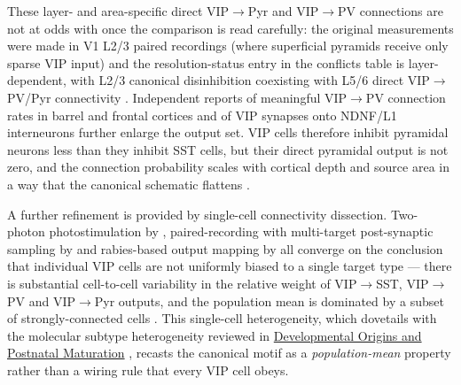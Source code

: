 \documentclass[11pt]{article}
\let\origrightarrow\rightarrow
\def\rightarrow{\ensuremath{\origrightarrow}}
\begin{document}
These layer- and area-specific direct VIP\rightarrow Pyr and VIP\rightarrow PV connections are not at odds with \citet{Pfeffer2013} once the comparison is read carefully: the original measurements were made in V1 L2/3 paired recordings (where superficial pyramids receive only sparse VIP input) and the resolution-status entry in the conflicts table is layer-dependent, with L2/3 canonical disinhibition coexisting with L5/6 direct VIP\rightarrow PV/Pyr connectivity \citep{Pfeffer2013, Yu2019, Zhou2017, Anastasiades2021a}. Independent reports of meaningful VIP\rightarrow PV connection rates in barrel and frontal cortices \citep{Anastasiades2021a, Pi2013} and of VIP synapses onto NDNF/L1 interneurons \citep{Schuman2019, Hafner2021} further enlarge the output set. VIP cells therefore inhibit pyramidal neurons less than they inhibit SST cells, but their direct pyramidal output is not zero, and the connection probability scales with cortical depth and source area in a way that the canonical schematic flattens \citep{Zhou2017, Anastasiades2021a, Walker2016, Pi2013, Schuman2019}.

A further refinement is provided by single-cell connectivity dissection. Two-photon photostimulation by \citet{Karnani2016b}, paired-recording with multi-target post-synaptic sampling by \citet{Walker2016} and rabies-based output mapping by \citet{Wall2016} all converge on the conclusion that individual VIP cells are not uniformly biased to a single target type --- there is substantial cell-to-cell variability in the relative weight of VIP\rightarrow SST, VIP\rightarrow PV and VIP\rightarrow Pyr outputs, and the population mean is dominated by a subset of strongly-connected cells \citep{Karnani2016b, Walker2016, Wall2016, Pronneke2019}. This single-cell heterogeneity, which dovetails with the molecular subtype heterogeneity reviewed in \href{/development}{Developmental Origins and Postnatal Maturation} \citep{Tasic2018, Pronneke2019, Pronneke2015}, recasts the canonical motif as a \textit{population-mean} property rather than a wiring rule that every VIP cell obeys.
\end{document}
